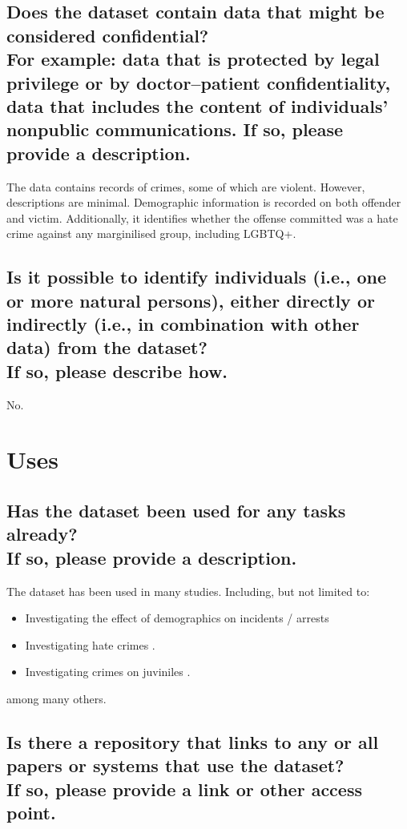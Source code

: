 \documentclass[letterpaper, 10 pt, conference]{ieeeconf}  %
\newcommand{\subtitle}[1]{{\\ \small \normalfont \color{purple} #1}}
\begin{document}
\subsection{Does the dataset contain data that might be considered confidential? \subtitle{For example: data that is protected by legal privilege or by doctor–patient confidentiality, data that includes the content of individuals’ nonpublic communications. If so, please provide a description.}}

The data contains records of crimes, some of which are violent. However, descriptions are minimal. Demographic information is recorded on both offender and victim. Additionally, it identifies whether the offense committed was a hate crime against any marginilised group, including LGBTQ+.


\subsection{Is it possible to identify individuals (i.e., one or more natural persons), either directly or indirectly (i.e., in combination with other data) from the dataset? \subtitle{If so, please describe how.}}

No.


\section{Uses}

\subsection{Has the dataset been used for any tasks already? \subtitle{If so, please provide a description.}}

The dataset has been used in many studies. Including, but not limited to:

\begin{itemize}
    \item Investigating the effect of demographics on incidents / arrests \cite{chilton1999using, chilton2007impact, butcher2022racial}
    \item Investigating hate crimes \cite{strom2001hate, shively2014understanding, zhang2021hate}.
    \item Investigating crimes on juviniles \cite{hamilton2019biased, finkelhor2000kidnaping}.
\end{itemize}

among many others.

\subsection{Is there a repository that links to any or all papers or systems that use the dataset? \subtitle{If so, please provide a link or other access point. }}
\end{document}
